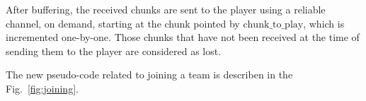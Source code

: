 
\label{sec:playing_chunks}

After buffering, the received chunks are sent to the player using a
reliable channel, on demand, starting at the chunk pointed by
$\text{chunk\_to\_play}$, which is incremented one-by-one. Those
chunks that have not been received at the time of sending them to the
player are considered as lost.

\begin{figure*}
   \caption{Code related to team
    joining.\label{fig:joining}}
\end{figure*}

The new pseudo-code related to joining a team is describen in the
Fig.~\ref{fig:joining}.

